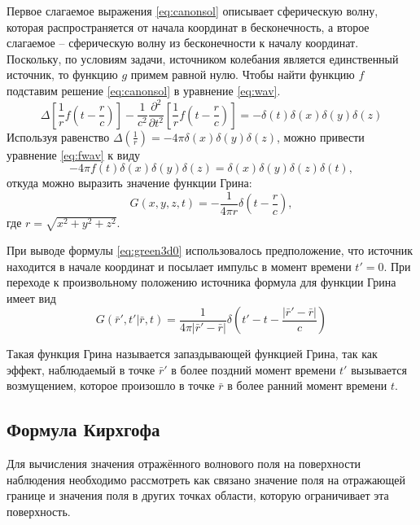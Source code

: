 \documentclass[a4paper, fontsize=14pt]{article}
\begin{document}
Первое слагаемое выражения \ref{eq:canonsol} описывает сферическую волну, которая распространяется от начала координат в бесконечность, а второе слагаемое -- сферическую волну из бесконечности к началу координат. Поскольку, по условиям задачи, источником колебания является единственный источник, то функцию $g$ примем равной нулю.  Чтобы найти функцию  $f$  подставим решение \ref{eq:canonsol} в уравнение \ref{eq:wav}. 
\begin{equation}
	\Delta \left[ \frac{1}{r}f\left(t-\frac{r}{c}\right) \right] - \frac{1}{c^2} \frac{\partial^2 }{\partial
		t^2}\left[ \frac{1}{r}f\left(t-\frac{r}{c}\right) \right]  = - \delta(t)\delta(x)\delta(y)\delta(z)
		\label{eq:fwav}
\end{equation}
Используя равенство $\Delta\left(\frac{1}{r}\right) = -4\pi \delta(x)\delta(y)\delta(z)$, можно привести уравнение \ref{eq:fwav}
к виду 
\begin{equation}
	-4\pi f(t) \delta(x) \delta(y) \delta(z)  = \delta(x) \delta(y) \delta(z) \delta(t),
\label{eq:fdel}	
\end{equation}
откуда можно выразить значение функции Грина:
\begin{equation}
	G(x,y,z,t) = -\frac{1}{4\pi r} \delta \left(t - \frac{r}{c}\right),
\label{eq:green3d0}	
\end{equation}  
где $r = \sqrt{x^2+y^2+z^2}$.

При выводе формулы \ref{eq:green3d0} использовалось предположение,  что источник находится в начале координат  и посылает импульс в момент времени $t' = 0$. При переходе к произвольному положению источника 
формула для функции Грина имеет вид
\begin{equation}
	G(\bar{r}',t'|\bar{r},t)= \frac{1}{4\pi|\bar{r}'-\bar{r}|}
	\delta\left(t'-t-\frac{|\bar{r}'-\bar{r}|}{c}\right)
\label{eq:green3d}
\end{equation}

	Такая функция Грина называется запаздывающей функцией Грина, так как эффект,
	наблюдаемый в точке $\bar{r}'$ в более поздний момент времени $t'$ вызывается
	возмущением,
	которое произошло в точке $\bar{r}$ в более ранний момент времени $t$.

	


	
	\subsection{Формула Кирхгофа}
	Для вычисления значения отражённого волнового поля на поверхности наблюдения необходимо 
	рассмотреть как связано значение поля на отражающей границе и значения поля в других точках области, которую ограничивает эта поверхность.   
	
\end{document}
